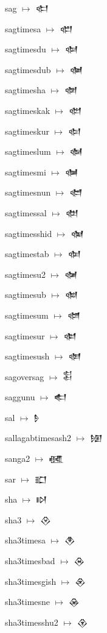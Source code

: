 {\noindent sag $\mapsto$ {\cufont 𒊕}\par
\noindent sagtimesa $\mapsto$ {\cufont 𒊖}\par
\noindent sagtimesdu $\mapsto$ {\cufont 𒊗}\par
\noindent sagtimesdub $\mapsto$ {\cufont 𒊘}\par
\noindent sagtimesha $\mapsto$ {\cufont 𒊙}\par
\noindent sagtimeskak $\mapsto$ {\cufont 𒊚}\par
\noindent sagtimeskur $\mapsto$ {\cufont 𒊛}\par
\noindent sagtimeslum $\mapsto$ {\cufont 𒊜}\par
\noindent sagtimesmi $\mapsto$ {\cufont 𒊝}\par
\noindent sagtimesnun $\mapsto$ {\cufont 𒊞}\par
\noindent sagtimessal $\mapsto$ {\cufont 𒊟}\par
\noindent sagtimesshid $\mapsto$ {\cufont 𒊠}\par
\noindent sagtimestab $\mapsto$ {\cufont 𒊡}\par
\noindent sagtimesu2 $\mapsto$ {\cufont 𒊢}\par
\noindent sagtimesub $\mapsto$ {\cufont 𒊣}\par
\noindent sagtimesum $\mapsto$ {\cufont 𒊤}\par
\noindent sagtimesur $\mapsto$ {\cufont 𒊥}\par
\noindent sagtimesush $\mapsto$ {\cufont 𒊦}\par
\noindent sagoversag $\mapsto$ {\cufont 𒊧}\par
\noindent saggunu $\mapsto$ {\cufont 𒊨}\par
\noindent sal $\mapsto$ {\cufont 𒊩}\par
\noindent sallagabtimesash2 $\mapsto$ {\cufont 𒊪}\par
\noindent sanga2 $\mapsto$ {\cufont 𒊫}\par
\noindent sar $\mapsto$ {\cufont 𒊬}\par
\noindent sha $\mapsto$ {\cufont 𒊭}\par
\noindent sha3 $\mapsto$ {\cufont 𒊮}\par
\noindent sha3timesa $\mapsto$ {\cufont 𒊯}\par
\noindent sha3timesbad $\mapsto$ {\cufont 𒊰}\par
\noindent sha3timesgish $\mapsto$ {\cufont 𒊱}\par
\noindent sha3timesne $\mapsto$ {\cufont 𒊲}\par
\noindent sha3timesshu2 $\mapsto$ {\cufont 𒊳}\par
}
